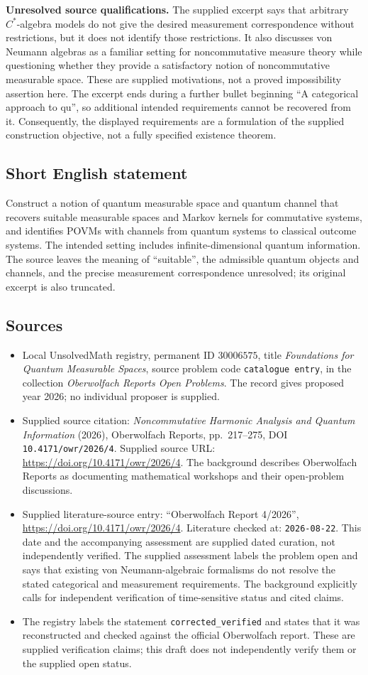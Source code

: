 \documentclass[11pt]{article}
\begin{document}
\textbf{Unresolved source qualifications.} The supplied excerpt says that arbitrary \(C^*\)-algebra models do not give the desired measurement correspondence without restrictions, but it does not identify those restrictions. It also discusses von Neumann algebras as a familiar setting for noncommutative measure theory while questioning whether they provide a satisfactory notion of noncommutative measurable space. These are supplied motivations, not a proved impossibility assertion here. The excerpt ends during a further bullet beginning ``A categorical approach to qu'', so additional intended requirements cannot be recovered from it. Consequently, the displayed requirements are a formulation of the supplied construction objective, not a fully specified existence theorem.
\subsection{Short English statement}
Construct a notion of quantum measurable space and quantum channel that recovers suitable measurable spaces and Markov kernels for commutative systems, and identifies POVMs with channels from quantum systems to classical outcome systems. The intended setting includes infinite-dimensional quantum information. The source leaves the meaning of ``suitable'', the admissible quantum objects and channels, and the precise measurement correspondence unresolved; its original excerpt is also truncated.
\subsection{Sources}
\begin{itemize}
\item Local UnsolvedMath registry, permanent ID \(30006575\), title \emph{Foundations for Quantum Measurable Spaces}, source problem code \texttt{catalogue entry}, in the collection \emph{Oberwolfach Reports Open Problems}. The record gives proposed year 2026; no individual proposer is supplied.
\item Supplied source citation: \emph{Noncommutative Harmonic Analysis and Quantum Information} (2026), Oberwolfach Reports, pp.\ 217--275, DOI \texttt{10.4171/owr/2026/4}. Supplied source URL: \url{https://doi.org/10.4171/owr/2026/4}. The background describes Oberwolfach Reports as documenting mathematical workshops and their open-problem discussions.
\item Supplied literature-source entry: ``Oberwolfach Report 4/2026'', \url{https://doi.org/10.4171/owr/2026/4}. Literature checked at: \texttt{2026-08-22}. This date and the accompanying assessment are supplied dated curation, not independently verified. The supplied assessment labels the problem open and says that existing von Neumann-algebraic formalisms do not resolve the stated categorical and measurement requirements. The background explicitly calls for independent verification of time-sensitive status and cited claims.
\item The registry labels the statement \texttt{corrected\_verified} and states that it was reconstructed and checked against the official Oberwolfach report. These are supplied verification claims; this draft does not independently verify them or the supplied open status.
\end{itemize}
\end{document}
